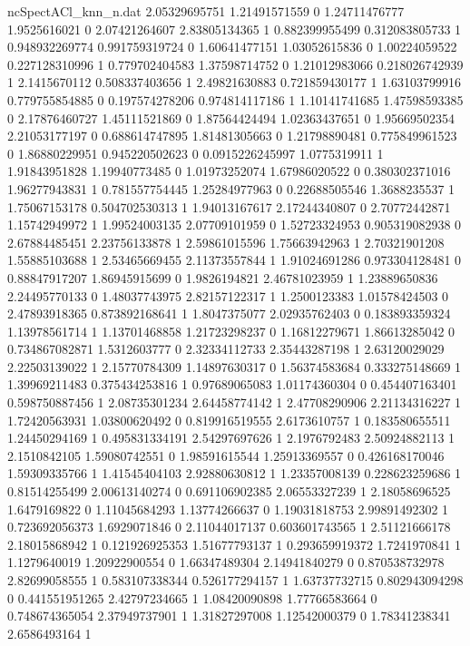 \begin{filecontents}{ncSpectACl_knn_n.dat}
2.05329695751 1.21491571559 0
1.24711476777 1.9525616021 0
2.07421264607 2.83805134365 1
0.882399955499 0.312083805733 1
0.948932269774 0.991759319724 0
1.60641477151 1.03052615836 0
1.00224059522 0.227128310996 1
0.779702404583 1.37598714752 0
1.21012983066 0.218026742939 1
2.1415670112 0.508337403656 1
2.49821630883 0.721859430177 1
1.63103799916 0.779755854885 0
0.197574278206 0.974814117186 1
1.10141741685 1.47598593385 0
2.17876460727 1.45111521869 0
1.87564424494 1.02363437651 0
1.95669502354 2.21053177197 0
0.688614747895 1.81481305663 0
1.21798890481 0.775849961523 0
1.86880229951 0.945220502623 0
0.0915226245997 1.0775319911 1
1.91843951828 1.19940773485 0
1.01973252074 1.67986020522 0
0.380302371016 1.96277943831 1
0.781557754445 1.25284977963 0
0.22688505546 1.3688235537 1
1.75067153178 0.504702530313 1
1.94013167617 2.17244340807 0
2.70772442871 1.15742949972 1
1.99524003135 2.07709101959 0
1.52723324953 0.905319082938 0
2.67884485451 2.23756133878 1
2.59861015596 1.75663942963 1
2.70321901208 1.55885103688 1
2.53465669455 2.11373557844 1
1.91024691286 0.973304128481 0
0.88847917207 1.86945915699 0
1.9826194821 2.46781023959 1
1.23889650836 2.24495770133 0
1.48037743975 2.82157122317 1
1.2500123383 1.01578424503 0
2.47893918365 0.873892168641 1
1.8047375077 2.02935762403 0
0.183893359324 1.13978561714 1
1.13701468858 1.21723298237 0
1.16812279671 1.86613285042 0
0.734867082871 1.5312603777 0
2.32334112733 2.35443287198 1
2.63120029029 2.22503139022 1
2.15770784309 1.14897630317 0
1.56374583684 0.333275148669 1
1.39969211483 0.375434253816 1
0.97689065083 1.01174360304 0
0.454407163401 0.598750887456 1
2.08735301234 2.64458774142 1
2.47708290906 2.21134316227 1
1.72420563931 1.03800620492 0
0.819916519555 2.6173610757 1
0.183580655511 1.24450294169 1
0.495831334191 2.54297697626 1
2.1976792483 2.50924882113 1
2.1510842105 1.59080742551 0
1.98591615544 1.25913369557 0
0.426168170046 1.59309335766 1
1.41545404103 2.92880630812 1
1.23357008139 0.228623259686 1
0.81514255499 2.00613140274 0
0.691106902385 2.06553327239 1
2.18058696525 1.6479169822 0
1.11045684293 1.13774266637 0
1.19031818753 2.99891492302 1
0.723692056373 1.6929071846 0
2.11044017137 0.603601743565 1
2.51121666178 2.18015868942 1
0.121926925353 1.51677793137 1
0.293659919372 1.7241970841 1
1.1279640019 1.20922900554 0
1.66347489304 2.14941840279 0
0.870538732978 2.82699058555 1
0.583107338344 0.526177294157 1
1.63737732715 0.802943094298 0
0.441551951265 2.42797234665 1
1.08420090898 1.77766583664 0
0.748674365054 2.37949737901 1
1.31827297008 1.12542000379 0
1.78341238341 2.6586493164 1

\end{filecontents}
